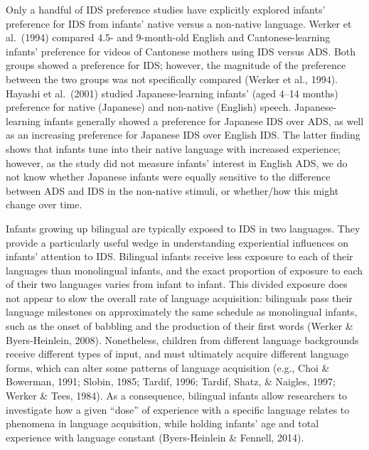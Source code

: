 \documentclass[,man,floatsintext]{apa6}
\begin{document}
Only a handful of IDS preference studies have explicitly explored infants' preference for IDS from infants' native versus a non-native language. Werker et al.~(1994) compared 4.5- and 9-month-old English and Cantonese-learning infants' preference for videos of Cantonese mothers using IDS versus ADS. Both groups showed a preference for IDS; however, the magnitude of the preference between the two groups was not specifically compared (Werker et al., 1994). Hayashi et al.~(2001) studied Japanese-learning infants' (aged 4--14 months) preference for native (Japanese) and non-native (English) speech. Japanese-learning infants generally showed a preference for Japanese IDS over ADS, as well as an increasing preference for Japanese IDS over English IDS. The latter finding shows that infants tune into their native language with increased experience; however, as the study did not measure infants' interest in English ADS, we do not know whether Japanese infants were equally sensitive to the difference between ADS and IDS in the non-native stimuli, or whether/how this might change over time.

Infants growing up bilingual are typically exposed to IDS in two languages. They provide a particularly useful wedge in understanding experiential influences on infants' attention to IDS. Bilingual infants receive less exposure to each of their languages than monolingual infants, and the exact proportion of exposure to each of their two languages varies from infant to infant. This divided exposure does not appear to slow the overall rate of language acquisition: bilinguals pass their language milestones on approximately the same schedule as monolingual infants, such as the onset of babbling and the production of their first words (Werker \& Byers-Heinlein, 2008). Nonetheless, children from different language backgrounds receive different types of input, and must ultimately acquire different language forms, which can alter some patterns of language acquisition (e.g., Choi \& Bowerman, 1991; Slobin, 1985; Tardif, 1996; Tardif, Shatz, \& Naigles, 1997; Werker \& Tees, 1984). As a consequence, bilingual infants allow researchers to investigate how a given \enquote{dose} of experience with a specific language relates to phenomena in language acquisition, while holding infants' age and total experience with language constant (Byers-Heinlein \& Fennell, 2014).
\end{document}
